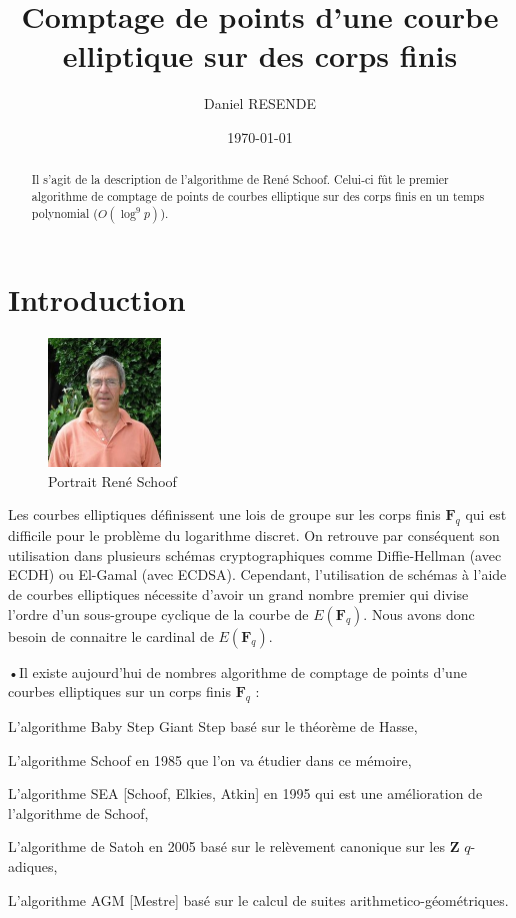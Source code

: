 \documentclass{article}%
\title{Comptage de points d'une courbe elliptique sur des corps finis}
\author{Daniel RESENDE}
\date{\today}
\theoremstyle{plain}
\theoremstyle{definition}
\theoremstyle{plain}
\theoremstyle{plain}
\theoremstyle{remark}
\newcommand\fq{\mathbf{F}_{q}}
\begin{document}
\maketitle

\begin{abstract}
Il s'agit de la description de l'algorithme de René Schoof. Celui-ci fût le premier algorithme de comptage de points de courbes elliptique sur des corps finis en un temps polynomial ($O(\log^{9} p)$).  
\end{abstract}

\tableofcontents

\clearpage{}
\section*{Introduction}

\begin{figure}
\includegraphics[width=3cm]{Rene_Schoof.jpg}
\caption{\label{étiquette}Portrait René Schoof}
\end{figure}
Les courbes elliptiques définissent une lois de groupe sur les corps finis $\fq$ qui est difficile pour le problème du logarithme discret. On retrouve par conséquent son utilisation dans plusieurs schémas cryptographiques comme Diffie-Hellman (avec ECDH) ou El-Gamal (avec ECDSA).
Cependant, l'utilisation de schémas à l'aide de courbes elliptiques nécessite d'avoir un grand nombre premier qui divise l'ordre d'un sous-groupe cyclique de la courbe de $E(\fq)$. Nous avons donc besoin de connaitre le cardinal de $E(\fq)$.

\begin{list}{•}{Il existe aujourd'hui de nombres algorithme de comptage de points d'une courbes elliptiques sur un corps finis $\fq$ :}
\item L'algorithme Baby Step Giant Step basé sur le théorème de Hasse,
\item L'algorithme Schoof en 1985 que l'on va étudier dans ce mémoire,
\item L'algorithme SEA [Schoof, Elkies, Atkin] en 1995 qui est une amélioration de l'algorithme de Schoof,
\item L'algorithme de Satoh en 2005 basé sur le relèvement canonique sur les $\mathbf{Z}$ $q$-adiques,
\item L'algorithme AGM [Mestre] basé sur le calcul de suites arithmetico-géométriques.
\end{list}
\end{document}
